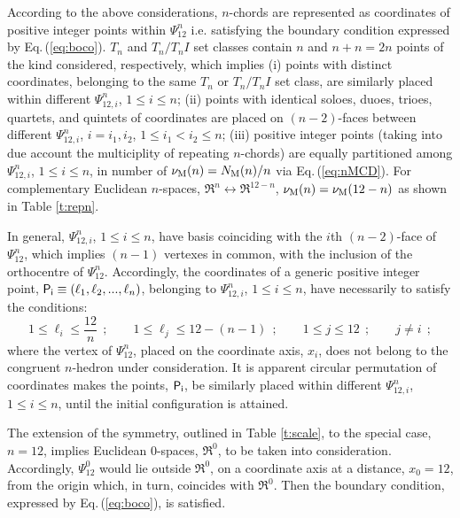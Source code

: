 \documentclass[12pt,a4paper]{article}
\begin{document}
According to the above considerations, $n$-chords are represented as
coordinates of positive integer points within $\Psi_{12}^n$ i.e. satisfying
the boundary condition expressed by Eq.\,(\ref{eq:boco}).
$T_n$ and $T_n/T_nI$ set classes contain $n$ and $n+n=2n$ 
points of the kind considered, respectively, which implies (i) points with
distinct coordinates, belonging to the same $T_n$ or $T_n/T_nI$ set class,
are similarly placed within
different $\Psi_{12,i}^n$, $1\le i\le n$; (ii) points with identical soloes,
duoes, trioes, quartets, and quintets of coordinates are placed on
$(n-2)$-faces between different $\Psi_{12,i}^n$, $i=i_1,i_2$,
$1\le i_1<i_2\le n$; (iii) positive integer points (taking into
due account the multiciplity of repeating $n$-chords) are equally partitioned
among $\Psi_{12,i}^n$, $1\le i\le n$, in number of
$\nu_{\rm M}(n)=N_{\rm M}(n)/n$ via Eq.\,(\ref{eq:nMCD}).
For complementary Euclidean $n$-spaces, $\Re^n\leftrightarrow\Re^{12-n}$,
$\nu_{\rm M}(n)=\nu_{\rm M}(12-n)$ as shown in Table \ref{t:repn}.
                                                  
In general, $\Psi_{12,i}^n$, $1\le i\le n$, have basis coinciding with the
$i$th $(n-2)$-face of $\Psi_{12}^n$, which implies $(n-1)$
vertexes in common, with the inclusion of the orthocentre of
$\Psi_{12}^n$.   Accordingly, the coordinates of a generic positive integer
point, ${\sf P_i}\equiv(\ell_{1},\ell_{2},...,\ell_{n})$, belonging to
$\Psi_{12,i}^n$, $1\le i\le n$, have necessarily to satisfy the conditions:
\begin{equation}
\label{eq:cic}
1\le\ell_i\le\frac{12}n~~;\qquad1\le\ell_j\le12-(n-1)~~;\qquad1\le j\le12~~;
\qquad j\ne i~~;
\end{equation}
where the vertex of $\Psi_{12}^n$, placed on the
coordinate axis, $x_i$, does not belong to the congruent $n$-hedron
under consideration.   It is apparent circular permutation of coordinates
makes the points, ${\sf P_i}$, be similarly placed within different
$\Psi_{12,i}^n$, $1\le i\le n$, until the initial configuration is attained.

The extension of the symmetry, outlined in Table \ref{t:scale}, to the special
case, $n=12$, implies Euclidean 0-spaces, $\Re^0$, to be taken into
consideration.
Accordingly, $\Psi_{12}^0$ would lie outside $\Re^0$, on a
coordinate axis at a distance, $x_0=12$, from the origin which, in turn,
coincides with $\Re^0$.   Then the boundary condition, expressed
by Eq.\,(\ref{eq:boco}), is satisfied.
\end{document}
